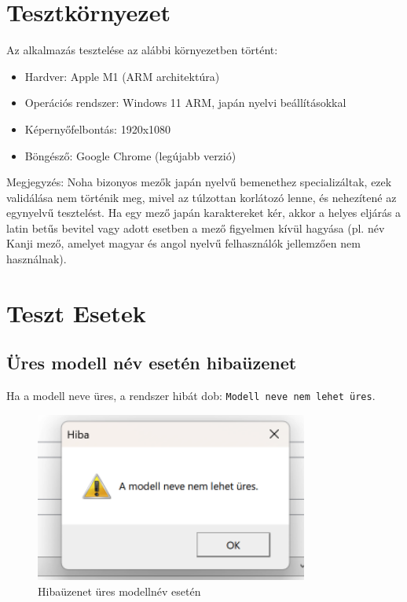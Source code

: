 \documentclass{report}[11pt]
\begin{document}
\section{Tesztkörnyezet}
Az alkalmazás tesztelése az alábbi környezetben történt:
\begin{itemize}
    \item Hardver: Apple M1 (ARM architektúra)
    \item Operációs rendszer: Windows 11 ARM, japán nyelvi beállításokkal
    \item Képernyőfelbontás: 1920x1080
    \item Böngésző: Google Chrome (legújabb verzió)
\end{itemize}

Megjegyzés: Noha bizonyos mezők japán nyelvű bemenethez specializáltak, ezek validálása nem történik meg, mivel az túlzottan korlátozó lenne, és nehezítené az egynyelvű tesztelést. Ha egy mező japán karaktereket kér, akkor a helyes eljárás a latin betűs bevitel vagy adott esetben a mező figyelmen kívül hagyása (pl. név Kanji mező, amelyet magyar és angol nyelvű felhasználók jellemzően nem használnak).

\section{Teszt Esetek}

\subsection{Üres modell név esetén hibaüzenet}
Ha a modell neve üres, a rendszer hibát dob: \texttt{Modell neve nem lehet üres}.

\begin{figure}[H]
    \centering
    \includegraphics[width=0.8\textwidth]{figures/empty_model_name_error.png}
    \caption{Hibaüzenet üres modellnév esetén}
    \label{fig:empty_model}
\end{figure}
\end{document}
